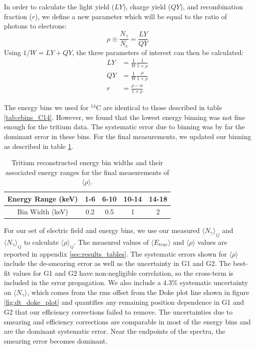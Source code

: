 In order to calculate the light yield ($LY$), charge yield ($QY$), and recombination fraction ($r$), we define a new parameter which will be equal to the ratio of photons to electrons:
\begin{equation}
\rho \equiv \frac{N_{\gamma}}{N_e}=\frac{LY}{QY}
\end{equation}
Using $1/W=LY+QY$, the three parameters of interest can then be calculated:
\begin{equation}\label{eq:translate_rho}
\begin{split}
LY&=\frac{1}{W}\frac{1}{1+\rho}\\[1em]
QY&=\frac{1}{W}\frac{\rho}{1+\rho}\\[1em]
r&=\frac{\rho-\alpha}{1+\rho}
\end{split}
\end{equation}

The energy bins we used for $^{14}$C are identical to those described in table \ref{tab:ebins_C14}. However, we found that the lowest energy binning was not fine enough for the tritium data. The systematic error due to binning was by far the dominant error in these bins. For the final measurements, we updated our binning as described in table \ref{tab:ebins_h3_new}.
\begin{table}[h!]
\centering
    \begin{tabular}{ c || c | c | c | c  }
    \hline
    Energy Range (keV) & 1-6  & 6-10 & 10-14 & 14-18\\
    \hline
    Bin Width (keV)         &  0.2      &  0.5         & 1           & 2 \\
    \hline
    \end{tabular}
    \caption{Tritium reconstructed energy bin widths and their associated energy ranges for the final measurements of $\langle \rho \rangle$.}
    \label{tab:ebins_h3_new}
\end{table}

For our set of electric field and energy bins, we use our measured $\langle N_{\gamma} \rangle_{ij}$ and $\langle N_{\gamma} \rangle_{ij}$ to calculate $\langle \rho \rangle_{ij}$. The measured values of $\langle E_{true} \rangle$ and $\langle \rho \rangle$ values are reported in appendix \ref{sec:results_tables}. The systematic errors shown for $\langle \rho \rangle$ include the de-smearing error as well as the uncertainty in G1 and G2. The best-fit values for G1 and G2 have non-negligible correlation, so the cross-term is included in the error propagation. We also include a 4.3\% systematic uncertainty on $\langle N_{\gamma} \rangle$, which comes from the rms offset from the Doke plot line shown in figure \ref{fig:dt_doke_plot} and quantifies any remaining position dependence in G1 and G2 that our efficiency corrections failed to remove. The uncertainties due to smearing and efficiency corrections are comparable in most of the energy bins and are the dominant systematic error. Near the endpoints of the spectra, the smearing error becomes dominant.

